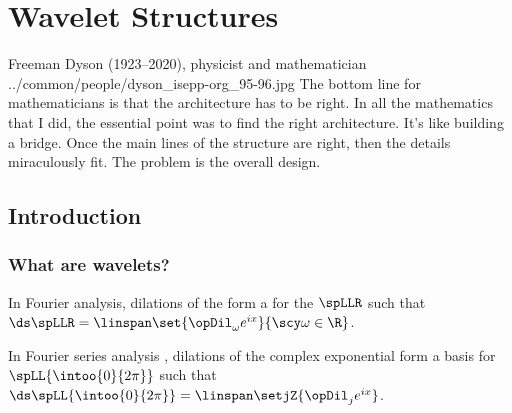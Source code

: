 ﻿%
\chapter{Wavelet Structures}
\qboxnps
  {
    Freeman Dyson (1923--2020), physicist and mathematician  %
    \footnotemark
  }
  {../common/people/dyson_isepp-org_95-96.jpg}  %
  {The bottom line for mathematicians is that the architecture has to be right.
    In all the mathematics that I did, the essential point was to find
    the right architecture.
    It's like building a bridge.
    Once the main lines of the structure are right,
    then the details miraculously fit.
    The problem is the overall design.}

\section{Introduction}
\subsection{What are wavelets?}
In Fourier analysis,  {dilations}  of the  
form a    for the  $\spLLR$  
such that
  \\\indentx$\ds\spLLR=\linspan\set{\opDil_\omega e^{ix}}{\scy\omega\in\R}$.

In Fourier series analysis ,  dilations of the complex exponential 
form a  basis for $\spLL{\intoo{0}{2\pi}}$ such that
  \\\indentx$\ds\spLL{\intoo{0}{2\pi}}=\linspan\setjZ{\opDil_j e^{ix}}$.

